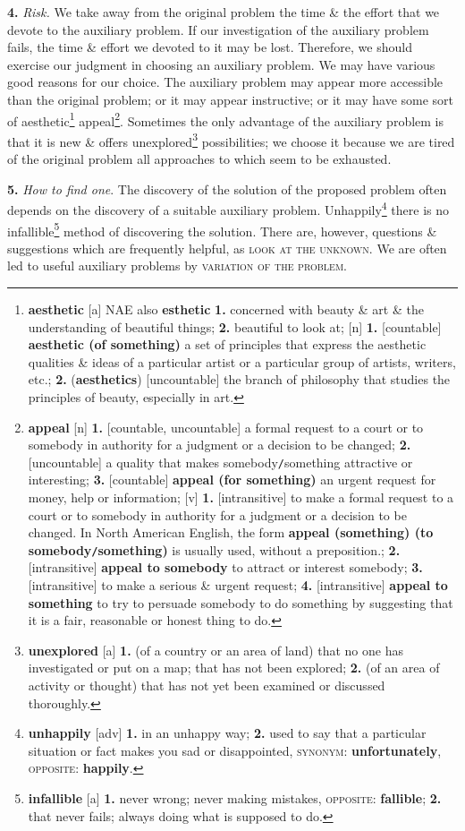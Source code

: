 \documentclass[oneside]{book}
\numberwithin{equation}{section}
\begin{document}
\textbf{4.} \textit{Risk.} We take away from the original problem the time \& the effort that we devote to the auxiliary problem. If our investigation of the auxiliary problem fails, the time \& effort we devoted to it may be lost. Therefore, we should exercise our judgment in choosing an auxiliary problem. We may have various good reasons for our choice. The auxiliary problem may appear more accessible than the original problem; or it may appear instructive; or it may have some sort of aesthetic\footnote{\textbf{aesthetic} [a] NAE also \textbf{esthetic} \textbf{1.} concerned with beauty \& art \& the understanding of beautiful things; \textbf{2.} beautiful to look at; [n] \textbf{1.} [countable] \textbf{aesthetic (of something)} a set of principles that express the aesthetic qualities \& ideas of a particular artist or a particular group of artists, writers, etc.; \textbf{2.} (\textbf{aesthetics}) [uncountable] the branch of philosophy that studies the principles of beauty, especially in art.} appeal\footnote{\textbf{appeal} [n] \textbf{1.} [countable, uncountable] a formal request to a court or to somebody in authority for a judgment or a decision to be changed; \textbf{2.} [uncountable] a quality that makes somebody\texttt{/}something attractive or interesting; \textbf{3.} [countable] \textbf{appeal (for something)} an urgent request for money, help or information; [v] \textbf{1.} [intransitive] to make a formal request to a court or to somebody in authority for a judgment or a decision to be changed. In North American English, the form \textbf{appeal (something) (to somebody\texttt{/}something)} is usually used, without a preposition.; \textbf{2.} [intransitive] \textbf{appeal to somebody} to attract or interest somebody; \textbf{3.} [intransitive] to make a serious \& urgent request; \textbf{4.} [intransitive] \textbf{appeal to something} to try to persuade somebody to do something by suggesting that it is a fair, reasonable or honest thing to do.}. Sometimes the only advantage of the auxiliary problem is that it is new \& offers unexplored\footnote{\textbf{unexplored} [a] \textbf{1.} (of a country or an area of land) that no one has investigated or put on a map; that has not been explored; \textbf{2.} (of an area of activity or thought) that has not yet been examined or discussed thoroughly.} possibilities; we choose it because we are tired of the original problem all approaches to which seem to be exhausted.

\textbf{5.} \textit{How to find one}. The discovery of the solution of the proposed problem often depends on the discovery of a suitable auxiliary problem. Unhappily\footnote{\textbf{unhappily} [adv] \textbf{1.} in an unhappy way; \textbf{2.} used to say that a particular situation or fact makes you sad or disappointed, \textsc{synonym}: \textbf{unfortunately}, \textsc{opposite}: \textbf{happily}.} there is no infallible\footnote{\textbf{infallible} [a] \textbf{1.} never wrong; never making mistakes, \textsc{opposite}: \textbf{fallible}; \textbf{2.} that never fails; always doing what is supposed to do.} method of discovering the solution. There are, however, questions \& suggestions which are frequently helpful, as \textsc{look at the unknown}. We are often led to useful auxiliary problems by \textsc{variation of the problem}.
\end{document}
